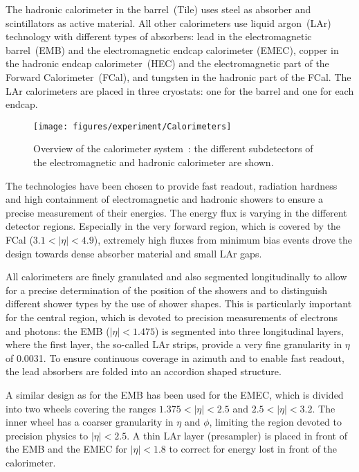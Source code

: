 The hadronic calorimeter in the barrel~(Tile) uses steel as absorber and scintillators as active material.
All other calorimeters use liquid argon~(LAr) technology with different types of absorbers:
lead in the electromagnetic barrel~(EMB) and the electromagnetic endcap calorimeter (EMEC),
copper in the hadronic endcap calorimeter~(HEC) and the electromagnetic part of the Forward Calorimeter~(FCal),
and tungsten in the hadronic part of the FCal.
The LAr calorimeters are placed in three cryostats: one for the barrel and one for each endcap.

\begin{figure}[h]
\begin{center}
\texttt{[image: figures/experiment/Calorimeters]}
\caption[Overview of the calorimeter system]{
  Overview of the calorimeter system~\cite{detectorpaper}:
  the different subdetectors of the electromagnetic and hadronic calorimeter are shown.}
\label{fig:calorimeters}
\end{center}
\end{figure}

The technologies have been chosen to provide fast readout, radiation hardness and high containment of electromagnetic and hadronic showers to ensure
a precise measurement of their energies.
The energy flux is varying in the different detector regions.
Especially in the very forward region, which is covered by the FCal (\mbox{$3.1 < |\eta| < 4.9$}), extremely high fluxes from minimum bias events
drove the design towards dense absorber material and small LAr gaps.

All calorimeters are finely granulated and also segmented longitudinally to allow for a precise determination of the position of the showers and to
distinguish different shower types by the use of shower shapes.
This is particularly important for the central region, which is devoted to precision measurements of electrons and photons:
the EMB (\mbox{$|\eta| < 1.475$}) is segmented into three longitudinal layers, where the first layer, the so-called LAr strips, provide
a very fine granularity in $\eta$ of 0.0031.
To ensure continuous coverage in azimuth and to enable fast readout, the lead absorbers are folded into an accordion shaped structure.

A similar design as for the EMB has been used for the EMEC, which is divided into two wheels covering the ranges \mbox{$1.375 < |\eta| < 2.5$}
and \mbox{$2.5 < |\eta| < 3.2$}.
The inner wheel has a coarser granularity in $\eta$ and $\phi$, limiting the region devoted to precision physics to \mbox{$|\eta| < 2.5$}.
A thin LAr layer (presampler) is placed in front of the EMB and the EMEC for \mbox{$|\eta| < 1.8$} to correct for energy lost in front of the calorimeter.

